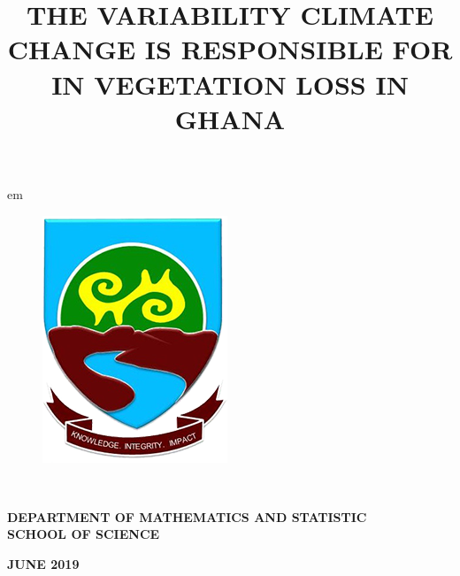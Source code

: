 \documentclass[12pt,a4paper]{book}
\begin{document}
	\pagestyle{plain}
	 em
	\begin{titlepage}
		\begin{center}
			
			\begin{figure}[h]
				\begin{center}
					\includegraphics[width=0.30\linewidth, height=.20\textheight]{uenrlogo.png}
				\end{center}
			\end{figure}
			
			{}\\
			\vspace{1.7cm}
			{\normalfont \title{THE VARIABILITY CLIMATE CHANGE IS RESPONSIBLE FOR IN
VEGETATION LOSS IN GHANA}}
			
			
			\vspace{2.7cm}
			
			{}
			\vspace{1.7cm}
			
			
			\begin{center}
				{\normalfont \textbf{DEPARTMENT OF MATHEMATICS AND STATISTIC}\\
					\textbf{SCHOOL OF SCIENCE}}\\
				\vspace{5.3cm}
				
				
				{\normalfont \textbf{JUNE 2019}}
			\end{center}
			
		\end{center}
		
		\vfill
	\end{titlepage}
\end{document}
